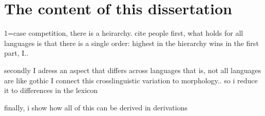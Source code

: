 \section{The content of this dissertation}


1=case competition, there is a heirarchy. cite people
first, what holds for all languages is that there is a single order: highest in the hierarchy wins
in the first part, I..

secondly I adress an aspect that differs across languages
that is, not all languages are like gothic
I connect this crosslinguistic variation to morphology.. so i reduce it to differences in the lexicon

finally, i show how all of this can be derived in derivations

